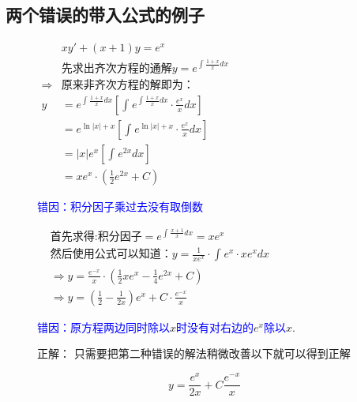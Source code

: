 \documentclass[fontset=windows]{article}
\begin{document}
    \subsection{两个错误的带入公式的例子}
    \begin{figure}[!htb]
    \begin{minipage}[t]{0.5\linewidth}
        \vspace*{2pt}
        \noindent
        $
            \begin{aligned}
                &xy'+(x+1)y=e^x\\
                &\mbox{先求出齐次方程的通解}y=e^{\int_{}^{}{\frac{1+x}{x} dx}}\\
                \Longrightarrow& \mbox{原来非齐次方程的解即为：}\\
                y&=e^{\int_{}^{}{\frac{1+x}{x} dx}}[\int_{}^{}{e^{\int_{}^{}{\frac{1+x}{x} dx}}\cdot \frac{e^x}{x} dx}]\\
                &=e^{\ln |x|+x}[\int_{}^{}{e^{\ln |x|+x} \cdot \frac{e^x} {x}dx}]\\
                &=|x|e^x[\int_{}^{}{e^{2x} dx}]\\
                &=xe^x\cdot(\frac{1}{2}e^{2x}+C)
            \end{aligned}
        $

        \textcolor{blue}{错因：积分因子乘过去没有取倒数}
    \end{minipage}
    \hfill
    \begin{minipage}[t]{0.5\linewidth}
        \vspace*{2pt}
        \noindent
        $
            \begin{aligned}
                &\text{首先求得:积分因子}=e^{\int_{}^{}{\frac{x+1}{x} dx}}=xe^x\nonumber \\
                &\text{然后使用公式可以知道：}y=\frac{1}{xe^x}\cdot \int_{}^{}{e^x\cdot xe^x dx}\nonumber \\
                &\Longrightarrow y = \frac{e^{-x}}{x}\cdot (\frac{1}{2}xe^x-\frac{1}{4}e^{2x}+C)\nonumber \\
                &\Longrightarrow y = (\frac{1}{2}-\frac{1}{2x})e^x + C\cdot \frac{e^{-x}}{x}\nonumber
            \end{aligned} 
        $
        \vspace*{4pt}

        \textcolor{blue}{错因：原方程两边同时除以}$x$\textcolor{blue}{时没有对右边的}$e^x$\textcolor{blue}{除以}$x$.

        正解： 只需要把第二种错误的解法稍微改善以下就可以得到正解
        \begin{tcolorbox}[colback=blue!5!white,colframe=blue!75!black,title=]
            \[
                y = \frac{e^x}{2x}+C\frac{e^{-x}}{x}
            \]
        \end{tcolorbox}  
    \end{minipage}
    \end{figure}
\end{document}
